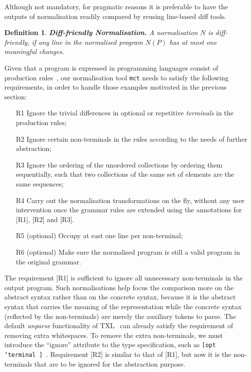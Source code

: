 \documentclass{acm_proc_article-sp}
\newtheorem{definition}{Definition}
\begin{document}
Although not mandatory, for pragmatic reasons it is preferable to have the outputs of normalisation readily compared by reusing line-based diff tools. 
\begin{definition}
{\bf Diff-friendly Normalisation.\label{defn:norm3}} A normalisation $N$ is diff-friendly, if any line in the normalised program $N(P)$ has at most one meaningful changes.
\end{definition}

Given that a program is expressed in programming languages consist of production rules~\cite{aho79}, our normalisation tool {\tt mct} needs to satisfy the following requirements, in order to handle those examples motivated in the previous section:
\begin{enumerate}
\item [R1] Ignore the trivial differences in optional or repetitive {\em terminals} in the production rules;
\item [R2] Ignore certain non-terminals in the rules according to the needs of further abstraction;
\item [R3] Ignore the ordering of the unordered collections by ordering them sequentially, such that two collections of the same set of elements are the same sequences;
\item [R4] Carry out the normalisation transformations on the fly, without any user intervention once the grammar rules are extended using the annotations for [R1], [R2] and [R3].
\item [R5] (optional) Occupy at east one line per non-terminal;
\item [R6] (optional) Make sure the normalised program is still a valid program in the original grammar.
\end{enumerate}

The requirement [R1] is sufficient to ignore all unnecessary non-terminals in the output program. Such normalisations help focus the comparison more on the abstract syntax rather than on the concrete syntax, because it is the abstract syntax that carries the meaning of the representation while the concrete syntax (reflected by the non-terminals) are merely the auxiliary tokens to parse. The default {\em unparse} functionality of TXL~\cite{txl} can already satisfy the requirement of removing extra whitespaces. To remove the extra non-terminals, we must introduce the ``ignore'' attribute to the type specification, such as {\tt [opt 'terminal ] }. Requirement [R2] is similar to that of [R1], but now it is the non-terminals that are to be ignored for the abstraction purpose. 
\end{document}
